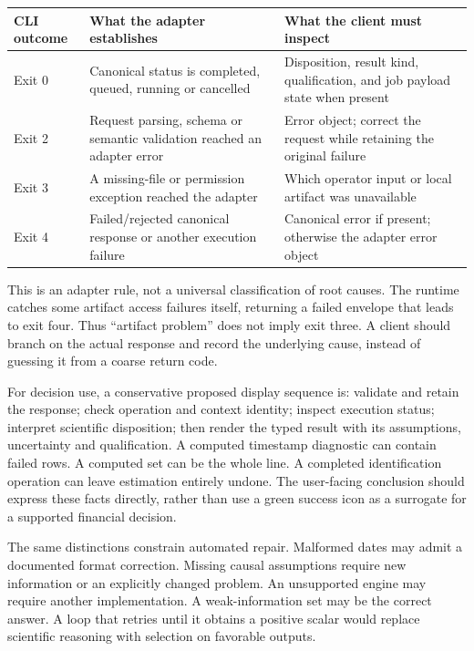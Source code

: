 \begin{center}
\begin{tabularx}{\textwidth}{P{.19\textwidth}X X}
\toprule
CLI outcome & What the adapter establishes & What the client must inspect \\
\midrule
Exit 0 & Canonical status is completed, queued, running or cancelled &
Disposition, result kind, qualification, and job payload state when present \\
Exit 2 & Request parsing, schema or semantic validation reached an adapter error &
Error object; correct the request while retaining the original failure \\
Exit 3 & A missing-file or permission exception reached the adapter &
Which operator input or local artifact was unavailable \\
Exit 4 & Failed/rejected canonical response or another execution failure &
Canonical error if present; otherwise the adapter error object \\
\bottomrule
\end{tabularx}
\end{center}
This is an adapter rule, not a universal classification of root causes. The
runtime catches some artifact access failures itself, returning a failed
envelope that leads to exit four. Thus ``artifact problem'' does not imply
exit three. A client should branch on the actual response and record the
underlying cause, instead of guessing it from a coarse return code.

For decision use, a conservative proposed display sequence is: validate and
retain the response; check operation and context identity; inspect execution
status; interpret scientific disposition; then render the typed result with
its assumptions, uncertainty and qualification. A computed timestamp
diagnostic can contain failed rows. A computed set can be the whole line.
A completed identification operation can leave estimation entirely undone.
The user-facing conclusion should express these facts directly, rather than
use a green success icon as a surrogate for a supported financial decision.

The same distinctions constrain automated repair. Malformed dates may admit
a documented format correction. Missing causal assumptions require new
information or an explicitly changed problem. An unsupported engine may
require another implementation. A weak-information set may be the correct
answer. A loop that retries until it obtains a positive scalar would replace
scientific reasoning with selection on favorable outputs.

